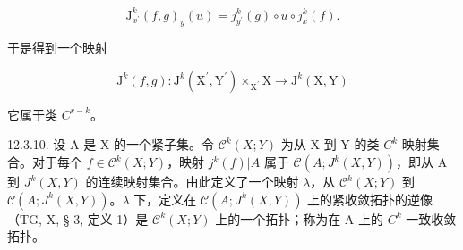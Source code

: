 \[
\mathrm{J} _ {x ^ {\prime}} ^ {k} (f, g) _ {y} (u) = j _ {y ^ {\prime}} ^ {k} (g) \circ u \circ j _ {x} ^ {k} (f).
\]

于是得到一个映射

\[
\mathrm{J} ^ {k} (f, g) \colon \mathrm{J} ^ {k} (\mathrm{X} ^ {\prime}, \mathrm{Y} ^ {\prime}) \times_ {\mathrm{X} ^ {\prime}} \mathrm{X} \rightarrow \mathrm{J} ^ {k} (\mathrm{X}, \mathrm{Y})
\]

它属于类 \(C^{r-k}\)。

12.3.10. 设 A 是 X 的一个紧子集。令 \(\mathcal{C}^{k}(X;Y)\) 为从 X 到 Y 的类 \(C^{k}\) 映射集合。对于每个 \(f\in\mathcal{C}^{k}(X;Y)\)，映射 \(j^{k}(f)|A\) 属于 \(\mathcal{C}(A;J^{k}(X,Y))\)，即从 A 到 \(J^{k}(X,Y)\) 的连续映射集合。由此定义了一个映射 \(\lambda\)，从 \(\mathcal{C}^{k}(X;Y)\) 到 \(\mathcal{C}(A;J^{k}(X,Y))\)。\(\lambda\) 下，定义在 \(\mathcal{C}(A;J^{k}(X,Y))\) 上的紧收敛拓扑的逆像（TG, X, § 3, 定义 1）是 \(\mathcal{C}^{k}(X;Y)\) 上的一个拓扑；称为在 A 上的 \(C^{k}\)-一致收敛拓扑。


